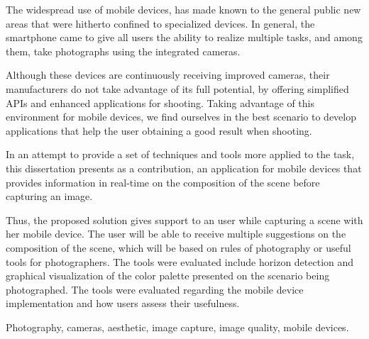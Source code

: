\abstractEN
The widespread use of mobile devices, has made known to the general public new areas that were hitherto confined to specialized devices. In general, the smartphone came to give all users the ability to realize multiple tasks, and among them, take photographs using the integrated cameras.


Although these devices are continuously receiving improved cameras, their manufacturers do not take advantage of its full potential, by offering simplified APIs and enhanced applications for shooting. Taking advantage of this environment for mobile devices, we find ourselves in the best scenario to develop applications that help the user obtaining a good result when shooting.


In an attempt to provide a set of techniques and tools more applied to the task, this dissertation presents as a contribution, an application for mobile devices that provides information in real-time on the composition of the scene before capturing an image.

Thus, the proposed solution gives support to an user while capturing a scene with her mobile device. The user will be able to receive multiple suggestions on the composition of the scene, which will be based on rules of photography or useful tools for photographers. The tools were evaluated include horizon detection and graphical visualization of the color palette presented on the scenario being photographed. The tools were evaluated regarding the mobile device implementation and how users assess their usefulness.

\begin{keywords}
Photography, cameras, aesthetic, image capture, image quality, mobile devices.
\end{keywords}
